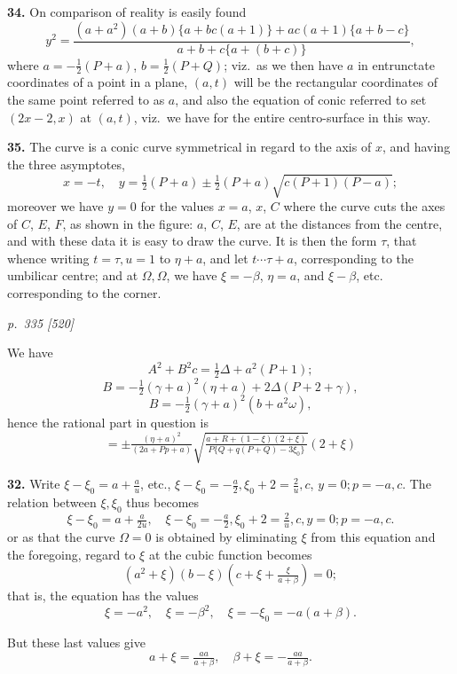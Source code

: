 \documentclass[11pt,a4paper]{book}
\begin{document}
\textbf{34.} On comparison of reality is easily found
\[
y^2 = \frac{(a + a^2)(a + b)\{a + bc(a + 1)\} + a c(a + 1)\{a + b - c\}}{a + b + c\{a + (b + c)\}},
\]
where $a = -\tfrac{1}{2}(P + a)$, $b = \tfrac{1}{2}(P + Q)$; viz.\ as we then have $a$ in entrunctate coordinates of a point in a plane, $(a, t)$ will be the rectangular coordinates of the same point referred to as $a$, and also the equation of conic referred to set $(2x - 2, x)$ at $(a, t)$, viz.\ we have for the entire centro-surface in this way.

\textbf{35.} The curve is a conic curve symmetrical in regard to the axis of $x$, and having the three asymptotes,
\[
x = -t,\quad y = \tfrac{1}{2}(P + a) \pm \tfrac{1}{2}(P + a)\sqrt{c(P + 1)(P - a)};
\]
moreover we have $y = 0$ for the values $x = a$, $x$, $C$ where the curve cuts the axes of $C$, $E$, $F$, as shown in the figure: $a$, $C$, $E$, are at the distances from the centre, and with these data it is easy to draw the curve. It is then the form $\tau$, that whence writing $t = \tau, u = 1$ to $\eta + a$, and let $t \cdots \tau + a$, corresponding to the umbilicar centre; and at $\Omega, \Omega$, we have $\xi = -\beta$, $\eta = a$, and $\xi - \beta$, etc. corresponding to the corner.

\clearpage

\bigskip
\textit{p.~335 [520]}
\smallskip

We have
\[
A^2 + B^2 c = \tfrac{1}{2}\Delta + a^2(P + 1);
\]
\[
B = -\tfrac{1}{2}(\gamma + a)^2(\eta + a) + 2\Delta(P + 2 + \gamma),
\]
\[
B = -\tfrac{1}{2}(\gamma + a)^2(b + a^2 \omega),
\]
hence the rational part in question is
\[
= \pm \tfrac{(\eta + a)^2}{(2a + Pp + a)}\sqrt{\tfrac{a + R + (1 - \xi)(2 + \xi)}{P\{Q + q(P + Q) - 3\xi_0\}}}(2 + \xi)
\]

\textbf{32.} Write $\xi - \xi_0 = a + \tfrac{a}{u}$, etc., $\xi - \xi_0 = -\tfrac{a}{2}, \xi_0 + 2 = \tfrac{2}{u}, c$, $y = 0; p = -a, c$. The relation between $\xi, \xi_0$ thus becomes
\[
\xi - \xi_0 = a + \tfrac{a}{2u}, \quad \xi - \xi_0 = -\tfrac{a}{2}, \xi_0 + 2 = \tfrac{2}{u}, c, y = 0; p = -a, c.
\]
or as that the curve $\Omega = 0$ is obtained by eliminating $\xi$ from this equation and the foregoing, regard to $\xi$ at the cubic function becomes
\[
(a^2 + \xi)(b - \xi)\!\left(c + \xi + \tfrac{\xi}{a + \beta}\right) = 0;
\]
that is, the equation has the values
\[
\xi = -a^2, \quad \xi = -\beta^2, \quad \xi = -\xi_0 = -a(a + \beta).
\]

But these last values give
\[
a + \xi = \tfrac{a a}{a + \beta}, \quad \beta + \xi = -\tfrac{a a}{a + \beta}.
\]
\end{document}
